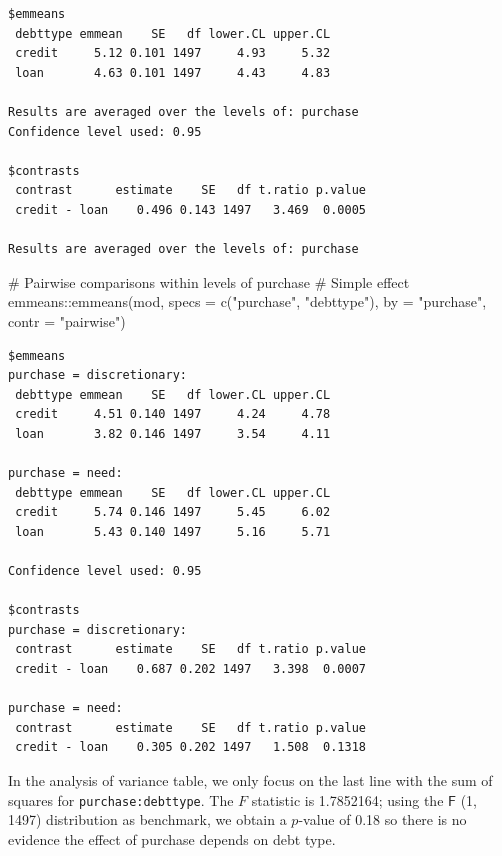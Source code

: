 \documentclass[
  11pt,
  letterpaper,
]{scrbook}
\newenvironment{Shaded}{\begin{snugshade}}{\end{snugshade}}
\newcommand{\AttributeTok}[1]{\textcolor[rgb]{0.40,0.45,0.13}{#1}}
\newcommand{\CommentTok}[1]{\textcolor[rgb]{0.37,0.37,0.37}{#1}}
\newcommand{\FunctionTok}[1]{\textcolor[rgb]{0.28,0.35,0.67}{#1}}
\newcommand{\NormalTok}[1]{\textcolor[rgb]{0.00,0.23,0.31}{#1}}
\newcommand{\SpecialCharTok}[1]{\textcolor[rgb]{0.37,0.37,0.37}{#1}}
\newcommand{\StringTok}[1]{\textcolor[rgb]{0.13,0.47,0.30}{#1}}
\theoremstyle{definition}
\theoremstyle{remark}
\begin{document}
\begin{verbatim}
$emmeans
 debttype emmean    SE   df lower.CL upper.CL
 credit     5.12 0.101 1497     4.93     5.32
 loan       4.63 0.101 1497     4.43     4.83

Results are averaged over the levels of: purchase 
Confidence level used: 0.95 

$contrasts
 contrast      estimate    SE   df t.ratio p.value
 credit - loan    0.496 0.143 1497   3.469  0.0005

Results are averaged over the levels of: purchase 
\end{verbatim}

\begin{Shaded}
\begin{Highlighting}[]
\CommentTok{\# Pairwise comparisons within levels of purchase}
\CommentTok{\# Simple effect}
\NormalTok{emmeans}\SpecialCharTok{::}\FunctionTok{emmeans}\NormalTok{(mod, }
                 \AttributeTok{specs =} \FunctionTok{c}\NormalTok{(}\StringTok{"purchase"}\NormalTok{, }\StringTok{"debttype"}\NormalTok{),}
                 \AttributeTok{by =} \StringTok{"purchase"}\NormalTok{,}
                 \AttributeTok{contr =} \StringTok{"pairwise"}\NormalTok{)}
\end{Highlighting}
\end{Shaded}

\begin{verbatim}
$emmeans
purchase = discretionary:
 debttype emmean    SE   df lower.CL upper.CL
 credit     4.51 0.140 1497     4.24     4.78
 loan       3.82 0.146 1497     3.54     4.11

purchase = need:
 debttype emmean    SE   df lower.CL upper.CL
 credit     5.74 0.146 1497     5.45     6.02
 loan       5.43 0.140 1497     5.16     5.71

Confidence level used: 0.95 

$contrasts
purchase = discretionary:
 contrast      estimate    SE   df t.ratio p.value
 credit - loan    0.687 0.202 1497   3.398  0.0007

purchase = need:
 contrast      estimate    SE   df t.ratio p.value
 credit - loan    0.305 0.202 1497   1.508  0.1318
\end{verbatim}

In the analysis of variance table, we only focus on the last line with
the sum of squares for \texttt{purchase:debttype}. The \(F\) statistic
is 1.7852164; using the \(\mathsf{F}\) (1, 1497) distribution as
benchmark, we obtain a \(p\)-value of 0.18 so there is no evidence the
effect of purchase depends on debt type.
\end{document}
